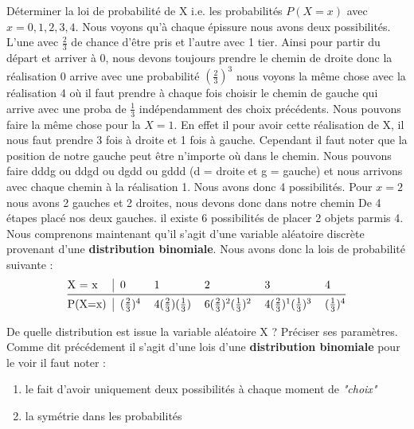 \begin{exo}
  \begin{subexo}{Déterminer la loi de probabilité de X i.e. les probabilités
      $P(X = x)$ avec $x = 0, 1, 2, 3, 4$.}
    Nous voyons qu'à chaque épissure nous avons deux possibilités.
    L'une avec $\frac{2}{3}$ de chance d'être pris et l'autre avec 1 tier.
    Ainsi pour partir du départ et arriver à 0,
    nous devons toujours prendre le chemin de droite donc la réalisation 0 arrive avec une
    probabilité $(\frac{2}{3})^3 $ nous voyons la même chose avec la réalisation 4 où il faut prendre
    à chaque fois choisir le chemin de gauche qui arrive avec une proba de $\frac{1}{3}$ indépendamment
    des choix précédents.
    Nous pouvons faire la même chose pour la $X = 1$. En effet il pour avoir cette réalisation de X,
    il nous faut prendre 3 fois à droite et 1 fois à gauche. Cependant il faut noter
    que la position de notre gauche peut être n'importe où dans le chemin.
    Nous pouvons faire dddg ou ddgd ou dgdd ou gddd (d = droite et g = gauche)
    et nous arrivons avec chaque chemin à la réalisation 1. Nous avons donc
    4 possibilités. Pour $x = 2$ nous avons 2 gauches et 2 droites, nous devons donc dans notre chemin De
    4 étapes placé nos deux gauches. il existe 6 possibilités de placer 2 objets parmis 4.
    Nous comprenons maintenant qu'il s'agit d'une variable aléatoire discrète provenant d'une
    \textbf{distribution binomiale}. Nous avons donc la lois de probabilité suivante :
    \[\begin{tabular}{@{}l|lllll@{}}
        X = x  & 0                                 & 1
               & 2                                 & 3
               & 4                                                                     \\ \midrule
        P(X=x) & $(\frac{2}{3})^4$                 & $4(\frac{2}{3})(\frac{1}{3})$
               & $6(\frac{2}{3})^2(\frac{1}{3})^2$ & $4(\frac{2}{3})^1(\frac{1}{3})^3$
               & $(\frac{1}{3})^4$
      \end{tabular}
    \]
  \end{subexo}
  \begin{subexo}{De quelle distribution est issue la variable aléatoire X ? 
    Préciser ses paramètres.}
  Comme dit précédement il s'agit d'une lois d'une\textbf{ distribution binomiale}
  pour le voir il faut noter :
  \begin{enumerate}[]
    \item le fait d'avoir uniquement deux possibilités à chaque moment de \textit{"choix"}
    \item la symétrie dans les probabilités 
  \end{enumerate}
  \end{subexo}
\end{exo}
